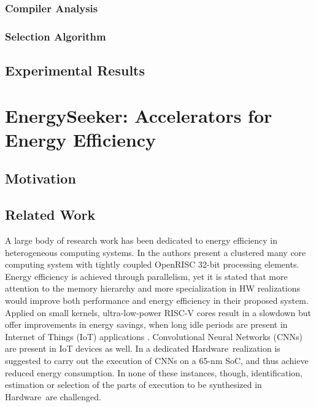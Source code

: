 \documentclass[]{usiinfthesis}
\newcommand{\HW}{{Hardware}}
\begin{document}
\subsubsection{Compiler Analysis}

\subsubsection{Selection Algorithm}




\subsection{Experimental Results}
\label{sec:results_as}



% 
%
%
%
%

\section{EnergySeeker: Accelerators for Energy Efficiency}

\subsection{Motivation}

\subsection{Related Work}

A large body of research work has been dedicated to energy efficiency in heterogeneous computing
systems. In \cite{MelpignanoJune12} \cite{ContiSep16} the authors present a clustered many core 
computing system with tightly coupled OpenRISC 32-bit processing elements. Energy efficiency is 
achieved through parallelism, yet it is stated that more attention to the memory hierarchy and 
more specialization in HW realizations would improve both performance and energy efficiency in 
their proposed system. Applied on small kernels, ultra-low-power RISC-V cores result in a slowdown 
but offer improvements in energy savings, when long idle periods are present in Internet of 
Things (IoT) applications \cite{SchiavoneSep17}. Convolutional Neural Networks (CNNs) are 
present in IoT devices as well. In \cite{PulliniJan17} a dedicated \HW\ realization is 
suggested to carry out the execution of CNNs on a 65-nm SoC, and thus achieve reduced energy
consumption. In none of these instances, though, identification, estimation or selection of
the parts of execution to be synthesized in \HW\ are challenged.\par
\end{document}
